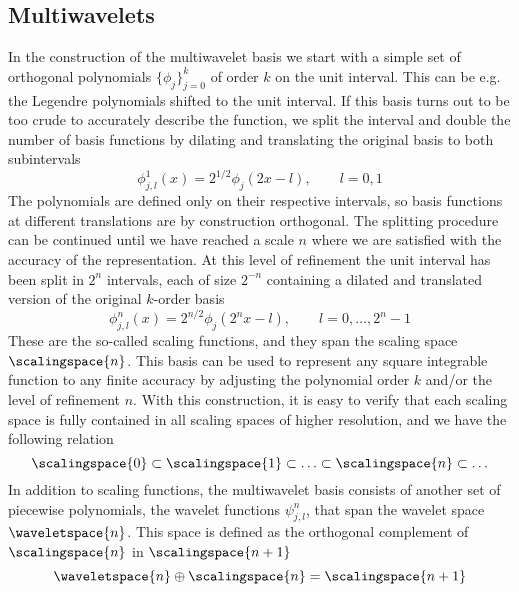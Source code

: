 \subsection{Multiwavelets}
In the construction of the multiwavelet basis we start with a simple set of 
orthogonal polynomials $\lbrace\phi_j\rbrace_{j=0}^k$ of order $k$ on the unit 
interval. This can be e.g. the Legendre polynomials shifted to the unit interval. 
If this basis turns out to be too crude to accurately describe the function, we 
split the interval and double the number of basis functions by dilating and 
translating the original basis to both subintervals
\begin{equation}
    \phi_{j,l}^1(x) = 2^{1/2}\phi_j(2x - l), \qquad l = 0,1
\end{equation}
The polynomials are defined only on their respective intervals, so basis functions 
at different translations are by construction orthogonal. The splitting procedure 
can be continued until we have reached a scale $n$ where we are satisfied with the 
accuracy of the representation. At this level of refinement the unit interval has 
been split in $2^n$ intervals, each of size $2^{-n}$ containing a dilated and 
translated version of the original $k$-order basis
\begin{equation}
    \label{eq:two_scale}
    \phi_{j,l}^n(x) = 2^{n/2}\phi_j(2^nx - l), \qquad l = 0,\dots,2^n-1
\end{equation}
These are the so-called scaling functions, and they span the scaling space 
$\scalingspace{n}$. This basis can be used to represent any square integrable 
function to any finite accuracy by adjusting the polynomial order $k$ and/or the 
level of refinement $n$. With this construction, it is easy to verify that each 
scaling space is fully contained in all scaling spaces of higher resolution, and 
we have the following relation
\begin{equation}
    \label{eq:MRA}
    \scalingspace{0} \subset \scalingspace{1} \subset \ldots
    \subset \scalingspace{n} \subset \ldots
\end{equation}
In addition to scaling functions, the multiwavelet basis consists of another set 
of piecewise polynomials, the wavelet functions $\psi_{j,l}^n$, that span the 
wavelet space $\waveletspace{n}$. This space is defined as the orthogonal 
complement of $\scalingspace{n}$ in $\scalingspace{n+1}$
\begin{equation}
    \label{eq:wavelet-def}
    \waveletspace{n} \oplus \scalingspace{n} = \scalingspace{n+1}
\end{equation}
